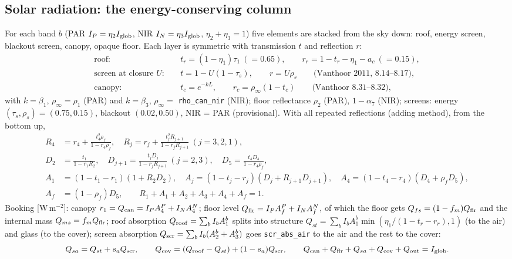 \documentclass[11pt,a4paper]{article}
\newcommand{\code}[1]{\texttt{#1}}
\begin{document}
\subsection{Solar radiation: the energy-conserving column}\label{sec:solar}
For each band $b$ (PAR $I_P=\eta_2I_{\rm glob}$, NIR $I_N=\eta_3I_{\rm glob}$, $\eta_2+\eta_3=1$) five elements are stacked
from the sky down: roof, energy screen, blackout screen, canopy, opaque floor. Each layer is symmetric with transmission
$t$ and reflection $r$:
\begin{align}
\text{roof:}\quad & t_r=(1-\eta_1)\tau_1\ (=0.65),\qquad r_r=1-t_r-\eta_1-a_c\ (=0.15),\\
\text{screen at closure }U:\quad & t=1-U(1-\tau_s),\qquad r=U\rho_s\qquad\text{(Vanthoor 2011, 8.14--8.17)},\\
\text{canopy:}\quad & t_c=e^{-kL},\qquad r_c=\rho_\infty(1-t_c)\qquad\text{(Vanthoor 8.31--8.32)},
\end{align}
with $k=\beta_1$, $\rho_\infty=\rho_1$ (PAR) and $k=\beta_3$, $\rho_\infty=$ \code{rho\_can\_nir} (NIR); floor reflectance
$\rho_2$ (PAR), $1-\alpha_7$ (NIR); screens: energy $(\tau_s,\rho_s)=(0.75,0.15)$, blackout $(0.02,0.50)$, NIR = PAR
(provisional). With all repeated reflections (adding method), from the bottom up,
\begin{align}
R_4&=r_4+\frac{t_4^2\rho_f}{1-r_4\rho_f},\quad R_j=r_j+\frac{t_j^2R_{j+1}}{1-r_jR_{j+1}}\ (j=3,2,1),\\
D_2&=\frac{t_1}{1-r_1R_2},\quad D_{j+1}=\frac{t_jD_j}{1-r_jR_{j+1}}\ (j=2,3),\quad D_5=\frac{t_4D_4}{1-r_4\rho_f},\\
A_1&=(1-t_1-r_1)(1+R_2D_2),\quad A_j=(1-t_j-r_j)(D_j+R_{j+1}D_{j+1}),\quad A_4=(1-t_4-r_4)(D_4+\rho_fD_5),\\
A_f&=(1-\rho_f)D_5,\qquad R_1+A_1+A_2+A_3+A_4+A_f=1 .
\end{align}
Booking [W\,m$^{-2}$]: canopy $r_1=Q_{\rm can}=I_PA_4^P+I_NA_4^N$; floor level $Q_{\rm flr}=I_PA_f^P+I_NA_f^N$, of which the
floor gets $Q_{fs}=(1-f_m)Q_{\rm flr}$ and the internal mass $Q_{ms}=f_mQ_{\rm flr}$; roof absorption
$Q_{\rm roof}=\sum_bI_bA_1^b$ splits into structure $Q_{st}=\sum_bI_bA_1^b\min(\eta_1/(1-t_r-r_r),1)$ (to the air) and glass (to the
cover); screen absorption $Q_{\rm scr}=\sum_bI_b(A_2^b+A_3^b)$ goes \code{scr\_abs\_air} to the air and the rest to the cover:
\begin{equation}
Q_{sa}=Q_{st}+s_aQ_{\rm scr},\qquad Q_{\rm cov}=(Q_{\rm roof}-Q_{st})+(1-s_a)Q_{\rm scr},\qquad
Q_{\rm can}+Q_{\rm flr}+Q_{sa}+Q_{\rm cov}+Q_{\rm out}=I_{\rm glob}.
\end{equation}
\end{document}
